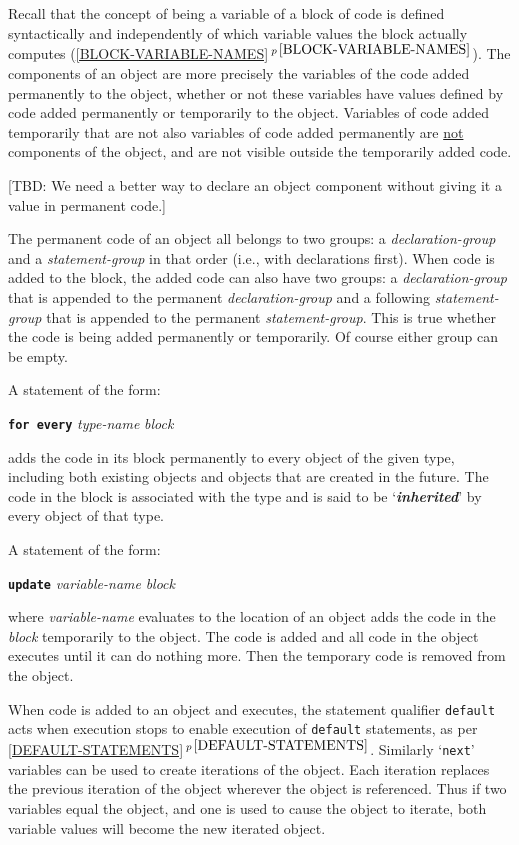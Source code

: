 \documentclass[12pt]{article}
\makeatletter
\newcommand{\skey}[2]{{\bf \em #1#2}\index{#1}}
\newcommand{\ttkey}[1]{{\tt \bf #1}\index{#1@{\tt #1}}}
\newcommand{\secref}[1]{\ref{#1}$\,^{p\,\pageref{#1}}$}
\newenvironment{indpar}[1][0.3in]%
	{\begin{list}{}%
		     {\setlength{\itemsep}{0in}%
		      \setlength{\topsep}{0in}%
		      \setlength{\parsep}{1ex}%
		      \setlength{\labelwidth}{#1}%
		      \setlength{\leftmargin}{#1}%
		      \addtolength{\leftmargin}{\labelsep}}%
	 \item}%
	{\end{list}}
\makeatother
\begin{document}
Recall that the concept of being a variable of a block
of code is defined syntactically and independently of which variable values
the block actually computes (\secref{BLOCK-VARIABLE-NAMES}).
The components of an object are more precisely the variables
of the code added permanently to the object, whether or not these
variables have values defined by code added permanently or temporarily
to the object.  Variables of code added temporarily that are not
also variables of code added permanently are
\underline{not} components of the object,
and are not visible outside the temporarily added code.

[TBD: We need a better way to declare an object component
without giving it a value in permanent code.]

The permanent code of an object all belongs to two groups: a
{\em declaration-group} and a {\em statement-group} in that
order (i.e., with declarations first).
When code is added to the block, the added code can also
have two groups: a {\em declaration-group} that is appended to the
permanent {\em declaration-group} and a following {\em statement-group} that
is appended to the permanent {\em statement-group}.  This is true whether
the code is being added permanently or temporarily.  Of course either
group can be empty.

A statement of the form:

\begin{indpar}
\ttkey{for every} {\em type-name} {\em block} 
\end{indpar}

adds the code in its block permanently to every object of the given type,
including both existing objects and objects that are
created in the future.  The code in the block is associated with the
type and is said to be `\skey{inherit}{ed}' by every object of that type.

A statement of the form:

\begin{indpar}
\ttkey{update} {\em variable-name} {\em block} 
\end{indpar}\label{UPDATE}

where {\em variable-name} evaluates to the location of an
object adds the code in the
{\em block} temporarily to the object.  The code is added and all
code in the object executes until it can do nothing more.  Then
the temporary code is removed from the object.

When code is added to an object and executes, the statement qualifier
{\tt default} acts when execution stops to enable execution of {\tt default}
statements, as per \secref{DEFAULT-STATEMENTS}.  Similarly
`{\tt next}' variables can be used to create iterations of the
object.  Each iteration replaces the previous iteration of the object
wherever the object is referenced.  Thus if two variables equal
the object, and one is used to cause the object to iterate, both variable
values will become the new iterated object.
\end{document}
